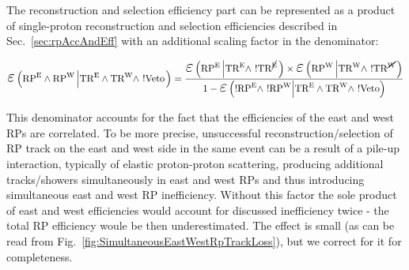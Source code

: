 The reconstruction and selection efficiency part can be represented as a product of single-proton reconstruction and selection efficiencies described in Sec.~\ref{sec:rpAccAndEff} with an additional scaling factor in the denominator:


\begin{equation}
\mbox{\LARGE$\varepsilon$}\left(\RPE\land\RPW\left|\TRE\land\TRW\land~!\V\right.\right)=\frac{\mbox{\LARGE$\varepsilon$}\left(\RPE\left|\TRE\land~!\TRNE\right.\right) \times \mbox{\LARGE$\varepsilon$}\left(\RPW\left|\TRW\land~!\TRNW\right.\right)}{1-\mbox{\LARGE$\varepsilon$}\left(!\RPE\land~!\RPW\Big|\TRE\land\TRW\land~!\V\Big.\right)}
\end{equation}

This denominator accounts for the fact that the efficiencies of the east and west RPs are correlated. To be more precise, unsuccessful reconstruction/selection of RP track on the east and west side in the same event can be a result of a pile-up interaction, typically of elastic proton-proton scattering, producing additional tracks/showers simultaneously in east and west RPs and thus introducing simultaneous east and west RP inefficiency. Without this factor the sole product of east and west efficiencies would account for discussed inefficiency twice - the total RP efficiency woule be then underestimated. The effect is small (as can be read from Fig.~\ref{fig:SimultaneousEastWestRpTrackLoss}), but we correct for it for completeness.


